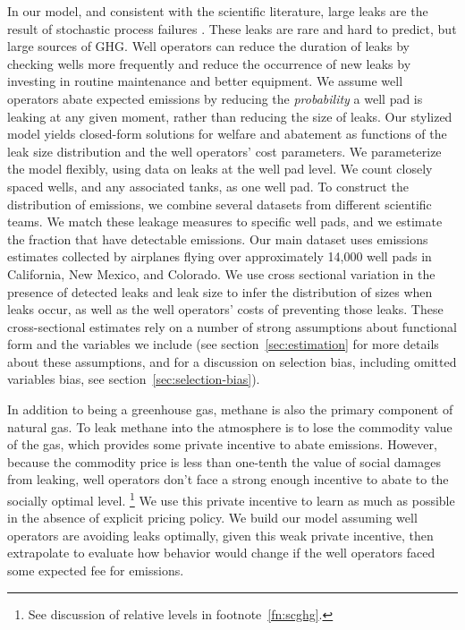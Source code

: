 In our model, and consistent with the scientific literature, large leaks are the result of stochastic process failures
\parencite{Lyon/Alvarez/Zavala-Araiza/Brandt/Jackson/Hamburg:2016, ZavalaAraiza/etal:2017}.
These leaks are rare and hard to predict, but large sources of \gls{GHG}.
Well operators can reduce the duration of leaks by checking wells more frequently and reduce the occurrence of new leaks by investing in routine maintenance and better equipment.
We assume well operators abate expected emissions by reducing the \emph{probability} a well pad is leaking at any given moment, rather than reducing the size of leaks.
Our stylized model yields closed-form solutions for welfare and abatement as functions of the leak size distribution and the well operators' cost parameters.
We parameterize the model flexibly, using data on leaks at the well pad level.
We count closely spaced wells, and any associated tanks, as one well pad.
To construct the distribution of emissions, we combine several datasets from different scientific teams.
We match these leakage measures to specific well pads, and we estimate the fraction that have detectable emissions.
Our main dataset uses emissions estimates collected by airplanes flying over approximately 14,000 well pads in California, New Mexico, and Colorado.
We use cross sectional variation in the presence of detected leaks and leak size to infer the distribution of sizes when leaks occur, as well as the well operators' costs of preventing those leaks.
These cross-sectional estimates rely on a number of strong assumptions about functional form and the variables we include (see section~\ref{sec:estimation} for more details about these assumptions, and for a discussion on selection bias, including omitted variables bias, see section~\ref{sec:selection-bias}).


In addition to being a greenhouse gas, methane is also the primary component of natural gas.
To leak methane into the atmosphere is to lose the commodity value of the gas,
which provides some private incentive to abate emissions.
However, because the commodity price is less than one-tenth the value of social damages from leaking, well operators don't face a strong enough incentive to abate to the socially optimal level.%
\footnote{See discussion of relative levels in footnote~\ref{fn:scghg}.}
We use this private incentive to learn as much as possible in the absence of explicit pricing policy.
We build our model assuming well operators are avoiding leaks optimally, given this weak private incentive, then extrapolate to evaluate how behavior would change if the well operators faced some expected fee for emissions.

